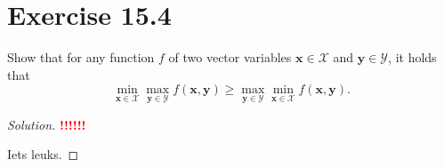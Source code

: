 \documentclass[10pt, a4paper, twoside]{amsart}
\newenvironment{solution}
               {\let\oldqedsymbol=\qedsymbol
                \renewcommand{\qedsymbol}{$\blacktriangleleft$}
                \begin{proof}[Solution]}
               {\end{proof}
                \renewcommand{\qedsymbol}{\oldqedsymbol}}
\newcommand{\TODO}{\textcolor{red}{\textbf{!!!!!! }}}
\begin{document}
\section*{Exercise 15.4}
Show that for any function $f$ of two vector variables $\mathbf{x} \in \mathcal{X}$ and $\mathbf{y} \in \mathcal{Y}$, it holds that
\begin{equation*}
 \min_{\mathbf{x} \in \mathcal{X}} \max_{\mathbf{y} \in \mathcal{Y}} f(\mathbf{x}, \mathbf{y}) \geq
 \max_{\mathbf{y} \in \mathcal{Y}} \min_{\mathbf{x} \in \mathcal{X}} f(\mathbf{x}, \mathbf{y}).
\end{equation*}
\begin{solution}
\TODO

Iets leuks.
\end{solution}
\end{document}
